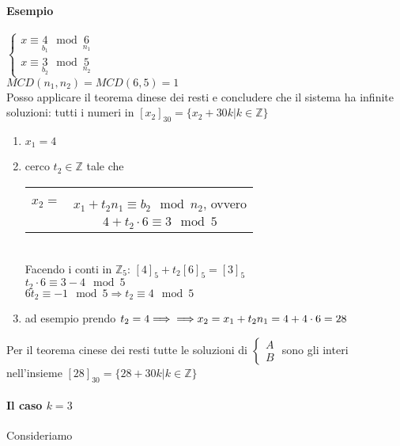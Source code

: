 \paragraph{Esempio}
$
\begin{cases}
    x\equiv \underset{b_1}{4}\mod \underset{n_1}{6}\\
    x\equiv \underset{b_2}{3}\mod \underset{n_2}{5}
\end{cases}
$\\
$MCD(n_1,n_2)=MCD(6,5)=1$ \\
Posso applicare il teorema dinese dei resti e concludere che il sistema ha infinite soluzioni: tutti i numeri in $[x_2]_30=\{x_2+30k|k\in\mathbb{Z}\}$
\begin{enumerate}
    \item $x_1=4$
    \item cerco $t_2\in\mathbb{Z}$ tale che 
        \begin{tabular}{c c}
            & \\
            $x_2=$ & $x_1+t_2n_1\equiv b_2\mod n_2$, ovvero\\
            & $4+t_2\cdot 6\equiv 3\mod 5$
        \end{tabular}\\
        Facendo i conti in $\mathbb{Z}_5$: $[4]_5+t_2[6]_5=[3]_5$\\
        $t_2\cdot 6\equiv 3-4 \mod 5$\\
        $6t_2\equiv -1\mod 5\Longrightarrow t_2\equiv 4\mod 5$
    \item ad esempio prendo $t_2=4\Longrightarrow \\
        \Longrightarrow x_2=x_1+t_2n_1=4+4\cdot 6=28$
\end{enumerate}
Per il teorema cinese dei resti tutte le soluzioni di $\begin{cases}A\\B\end{cases}$ 
sono gli interi nell'insieme 
$[28]_{30} = \{28+30k|k\in\mathbb{Z}\}$
\paragraph{Il caso $k=3$} Consideriamo \\

